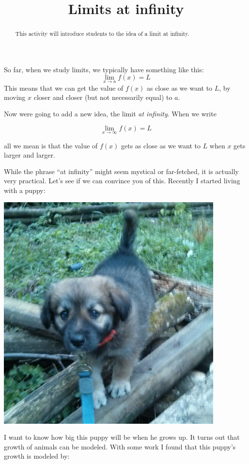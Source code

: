 \documentclass{ximera}
\title{Limits at infinity}
\begin{document}
\begin{abstract}
  This activity will introduce students to the idea of a limit at infinity.
\end{abstract}
\maketitle

So far, when we study limits, we typically have something like this:
\[
\lim_{x\to a} f(x) = L
\]
This means that we can get the value of $f(x)$ as close as we want to
$L$, by moving $x$ closer and closer (but not necessarily equal) to $a$. 

Now were going to add a new idea, the limit \textit{at infinity}. When
we write

\[
\lim_{x\to \infty} f(x) = L
\]

all we mean is that the value of $f(x)$ gets as close as we want to
$L$ when $x$ gets larger and larger. 

While the phrase ``at infinity'' might seem mystical or far-fetched,
it is actually very practical. Let's see if we can convince you of
this. Recently I started living with a puppy:

\begin{image}
\includegraphics{puppy.png}
\end{image}

I want to know how big this puppy will be when he grows up. It turns
out that growth of animals can be modeled. With some work I found that
this puppy's growth is modeled by:
\end{document}
